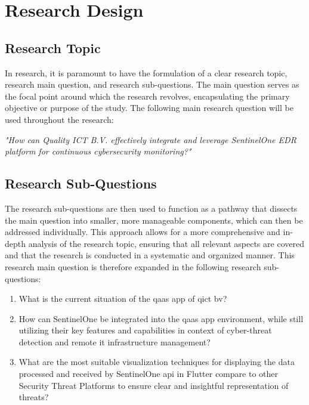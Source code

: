 \chapter{Research Design}
\begin{multicols}{2}
  \section{Research Topic}
  In research, it is paramount to have the formulation of a clear research topic, research main question,
  and research sub-questions. The main question serves as the focal point around which the research revolves,
  encapsulating the primary objective or purpose of the study.
  The following main research question will be used throughout the research:
  \begin{center}
    \textit{"How can Quality ICT B.V. effectively integrate and leverage SentinelOne EDR platform
      for continuous cybersecurity monitoring?"}
  \end{center}
  \section{Research Sub-Questions}
  The research sub-questions are then used to function as a pathway that dissects the main
  question into smaller, more manageable components, which can then be addressed individually. This approach
  allows for a more comprehensive and in-depth analysis of the research topic, ensuring that all relevant
  aspects are covered and that the research is conducted in a systematic and organized manner.
  This research main question is therefore expanded in the following research sub-questions:
  \begin{enumerate}
    \item What is the current situation of the \acrshort{qaas} app of \acrlong{qict} \acrshort{bv}?
    \item How can SentinelOne be integrated into the \acrshort{qaas} app environment, while still
          utilizing their key features and capabilities in context of cyber-threat detection and
          remote \acrshort{it} infrastructure management?
    \item What are the most suitable visualization techniques for displaying the data processed and
          received by  SentinelOne \acrshort{api} in Flutter compare to other Security Threat Platforms to
          ensure clear and insightful representation of threats?
  \end{enumerate}

\end{multicols}
